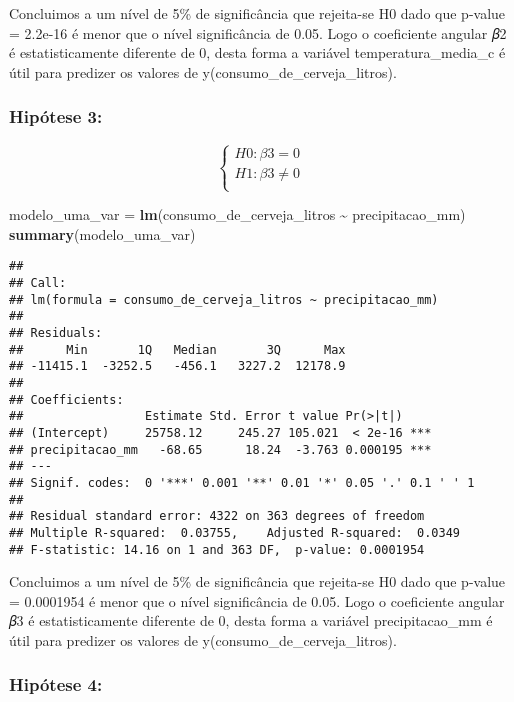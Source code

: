 \documentclass[
]{article}
\newenvironment{Shaded}{\begin{snugshade}}{\end{snugshade}}
\newcommand{\FunctionTok}[1]{\textcolor[rgb]{0.13,0.29,0.53}{\textbf{#1}}}
\newcommand{\NormalTok}[1]{#1}
\newcommand{\OtherTok}[1]{\textcolor[rgb]{0.56,0.35,0.01}{#1}}
\newcommand{\SpecialCharTok}[1]{\textcolor[rgb]{0.81,0.36,0.00}{\textbf{#1}}}
\begin{document}
Concluimos a um nível de 5\% de significância que rejeita-se H0 dado que
p-value = 2.2e-16 é menor que o nível significância de 0.05. Logo o
coeficiente angular 𝛽2 é estatisticamente diferente de 0, desta forma a
variável temperatura\_media\_c é útil para predizer os valores de
y(consumo\_de\_cerveja\_litros).

\hypertarget{hipuxf3tese-3}{%
\subsubsection{Hipótese 3:}\label{hipuxf3tese-3}}

\[
\left\{ \begin{array}{rc} 
H0: \beta3 = 0 \\ 
H1: \beta3 \neq 0 \\ 
\end{array}\right.
\]

\begin{Shaded}
\begin{Highlighting}[]
\NormalTok{modelo\_uma\_var }\OtherTok{=} \FunctionTok{lm}\NormalTok{(consumo\_de\_cerveja\_litros }\SpecialCharTok{\textasciitilde{}}\NormalTok{ precipitacao\_mm)}
\FunctionTok{summary}\NormalTok{(modelo\_uma\_var)}
\end{Highlighting}
\end{Shaded}

\begin{verbatim}
## 
## Call:
## lm(formula = consumo_de_cerveja_litros ~ precipitacao_mm)
## 
## Residuals:
##      Min       1Q   Median       3Q      Max 
## -11415.1  -3252.5   -456.1   3227.2  12178.9 
## 
## Coefficients:
##                 Estimate Std. Error t value Pr(>|t|)    
## (Intercept)     25758.12     245.27 105.021  < 2e-16 ***
## precipitacao_mm   -68.65      18.24  -3.763 0.000195 ***
## ---
## Signif. codes:  0 '***' 0.001 '**' 0.01 '*' 0.05 '.' 0.1 ' ' 1
## 
## Residual standard error: 4322 on 363 degrees of freedom
## Multiple R-squared:  0.03755,    Adjusted R-squared:  0.0349 
## F-statistic: 14.16 on 1 and 363 DF,  p-value: 0.0001954
\end{verbatim}

Concluimos a um nível de 5\% de significância que rejeita-se H0 dado que
p-value = 0.0001954 é menor que o nível significância de 0.05. Logo o
coeficiente angular 𝛽3 é estatisticamente diferente de 0, desta forma a
variável precipitacao\_mm é útil para predizer os valores de
y(consumo\_de\_cerveja\_litros).

\hypertarget{hipuxf3tese-4}{%
\subsubsection{Hipótese 4:}\label{hipuxf3tese-4}}
\end{document}

